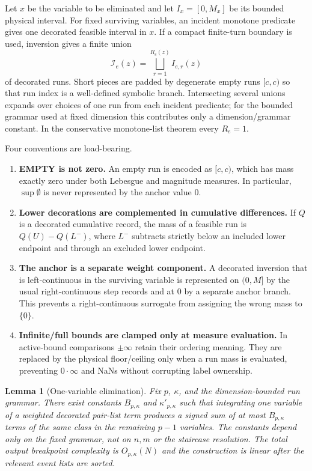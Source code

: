 \documentclass[12pt,a4paper]{article}
\newtheorem{lemma}[theorem]{Lemma}
\theoremstyle{definition}
\newcommand{\1}{\mathbf 1}
\begin{document}
Let $x$ be the variable to be eliminated and let $I_x=[0,M_x]$ be its bounded physical interval. For fixed surviving variables, an incident monotone predicate gives one decorated feasible interval in $x$. If a compact finite-turn boundary is used, inversion gives a finite union
\[
\mathcal I_e(z)=\bigsqcup_{r=1}^{R_e(z)} I_{e,r}(z)
\]
of decorated runs. Short pieces are padded by degenerate empty runs $[c,c)$ so that run index is a well-defined symbolic branch. Intersecting several unions expands over choices of one run from each incident predicate; for the bounded grammar used at fixed dimension this contributes only a dimension/grammar constant. In the conservative monotone-list theorem every $R_e=1$.

Four conventions are load-bearing.
\begin{enumerate}
\item \textbf{EMPTY is not zero.} An empty run is encoded as $[c,c)$, which has mass exactly zero under both Lebesgue and magnitude measures. In particular, $\sup\emptyset$ is never represented by the anchor value $0$.
\item \textbf{Lower decorations are complemented in cumulative differences.} If $Q$ is a decorated cumulative record, the mass of a feasible run is $Q(U)-Q(L^-)$, where $L^-$ subtracts strictly below an included lower endpoint and through an excluded lower endpoint.
\item \textbf{The anchor is a separate weight component.} A decorated inversion that is left-continuous in the surviving variable is represented on $(0,M]$ by the usual right-continuous step records and at $0$ by a separate anchor branch. This prevents a right-continuous surrogate from assigning the wrong mass to $\{0\}$.
\item \textbf{Infinite/full bounds are clamped only at measure evaluation.} In active-bound comparisons $\pm\infty$ retain their ordering meaning. They are replaced by the physical floor/ceiling only when a run mass is evaluated, preventing $0\cdot\infty$ and NaNs without corrupting label ownership.
\end{enumerate}

\begin{lemma}[One-variable elimination]                          \label{lem:oneelim}
Fix $p$, $\kappa$, and the dimension-bounded run grammar. There exist constants $B_{p,\kappa}$ and $\kappa'_{p,\kappa}$ such that integrating one variable of a weighted decorated pair-list term produces a signed sum of at most $B_{p,\kappa}$ terms of the same class in the remaining $p-1$ variables. The constants depend only on the fixed grammar, not on $n,m$ or the staircase resolution. The total output breakpoint complexity is $O_{p,\kappa}(N)$ and the construction is linear after the relevant event lists are sorted.
\end{lemma}
\end{document}
